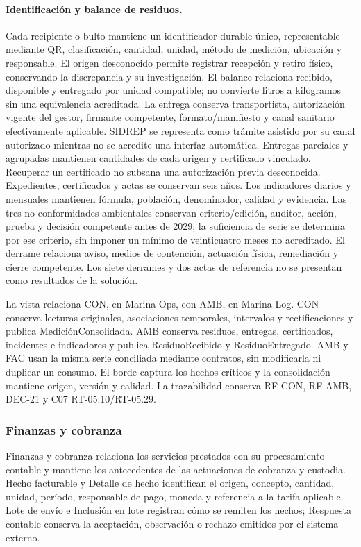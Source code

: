 \paragraph{Identificación y balance de residuos.}
Cada recipiente o bulto mantiene un identificador durable único, representable mediante QR, clasificación, cantidad, unidad, método de medición, ubicación y responsable. El origen desconocido permite registrar recepción y retiro físico, conservando la discrepancia y su investigación. El balance relaciona recibido, disponible y entregado por unidad compatible; no convierte litros a kilogramos sin una equivalencia acreditada.
La entrega conserva transportista, autorización vigente del gestor, firmante competente, formato/manifiesto y canal sanitario efectivamente aplicable. SIDREP se representa como trámite asistido por su canal autorizado mientras no se acredite una interfaz automática. Entregas parciales y agrupadas mantienen cantidades de cada origen y certificado vinculado. Recuperar un certificado no subsana una autorización previa desconocida. Expedientes, certificados y actas se conservan seis años.
Los indicadores diarios y mensuales mantienen fórmula, población, denominador, calidad y evidencia. Las tres no conformidades ambientales conservan criterio/edición, auditor, acción, prueba y decisión competente antes de 2029; la suficiencia de serie se determina por ese criterio, sin imponer un mínimo de veinticuatro meses no acreditado. El derrame relaciona aviso, medios de contención, actuación física, remediación y cierre competente. Los siete derrames y dos actas de referencia no se presentan como resultados de la solución.

La vista relaciona CON, en Marina-Ops, con AMB, en Marina-Log. CON conserva lecturas originales, asociaciones temporales, intervalos y rectificaciones y publica MediciónConsolidada. AMB conserva residuos, entregas, certificados, incidentes e indicadores y publica ResiduoRecibido y ResiduoEntregado. AMB y FAC usan la misma serie conciliada mediante contratos, sin modificarla ni duplicar un consumo. El borde captura los hechos críticos y la consolidación mantiene origen, versión y calidad. La trazabilidad conserva RF-CON, RF-AMB, DEC-21 y C07 RT-05.10/RT-05.29.


\subsubsection{Finanzas y cobranza}
Finanzas y cobranza relaciona los servicios prestados con su procesamiento contable y mantiene los antecedentes de las actuaciones de cobranza y custodia. Hecho facturable y Detalle de hecho identifican el origen, concepto, cantidad, unidad, período, responsable de pago, moneda y referencia a la tarifa aplicable. Lote de envío e Inclusión en lote registran cómo se remiten los hechos; Respuesta contable conserva la aceptación, observación o rechazo emitidos por el sistema externo.

